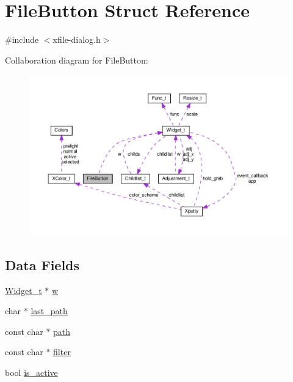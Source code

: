 \hypertarget{structFileButton}{}\section{File\+Button Struct Reference}
\label{structFileButton}


{\ttfamily \#include $<$xfile-\/dialog.\+h$>$}



Collaboration diagram for File\+Button\+:
\nopagebreak
\begin{figure}[H]
\begin{center}
\leavevmode
\includegraphics[width=350pt]{structFileButton__coll__graph}
\end{center}
\end{figure}
\subsection*{Data Fields}
\begin{DoxyCompactItemize}
\item 
\hyperlink{structWidget__t}{Widget\+\_\+t} $\ast$ \hyperlink{structFileButton_a71ffa5736225a6fc2f848c4d6e26f706}{w}
\item 
char $\ast$ \hyperlink{structFileButton_a382ea13eda05543ca0e11be7643bb1a0}{last\+\_\+path}
\item 
const char $\ast$ \hyperlink{structFileButton_aaa44245f847e77d5bf2742c0c4cf88d8}{path}
\item 
const char $\ast$ \hyperlink{structFileButton_a37b3aeb613735345fbfad7c32f681771}{filter}
\item 
bool \hyperlink{structFileButton_a2afbb3418ecfdf27adbd8f8022160e93}{is\+\_\+active}
\end{DoxyCompactItemize}


